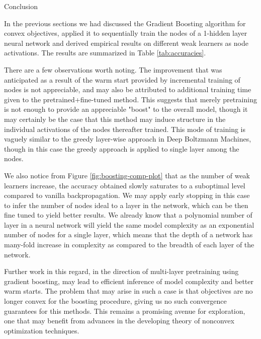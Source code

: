 \documentclass{article}
\begin{document}
\begin{psection}{Conclusion}

	In the previous sections we had discussed the Gradient Boosting algorithm for convex objectives, applied it to sequentially train the nodes of a 1-hidden layer neural network and derived empirical results on different weak learners as node activations. The results are summarized in Table \ref{tab:accuracies}.

	There are a few observations worth noting. The improvement that was anticipated as a result of the warm start provided by incremental training of nodes is not appreciable, and may also be attributed to additional training time given to the pretrained+fine-tuned method. This suggests that merely pretraining is not enough to provide an appreciable "boost" to the overall model, though it may certainly be the case that this method may induce structure in the individual activations of the nodes thereafter trained. This mode of training is vaguely similar to the greedy layer-wise approach in Deep Boltzmann Machines, though in this case the greedy approach is applied to single layer among the nodes.

	We also notice from Figure \ref{fig:boosting-comp-plot} that as the number of weak learners increase, the accuracy obtained slowly saturates to a suboptimal level compared to vanilla backpropagation. We may apply early stopping in this case to infer the number of nodes ideal to a layer in the network, which can be then fine tuned to yield better results. We already know that a polynomial number of layer in a neural network will yield the same model complexity as an exponential number of nodes for a single layer, which means that the depth of a network has many-fold increase in complexity as compared to the breadth of each layer of the network.

	Further work in this regard, in the direction of multi-layer pretraining using gradient boosting, may lead to efficient inference of model complexity and better warm starts. The problem that may arise in such a  case is that objectives are no longer convex for the boosting procedure, giving us no such convergence guarantees for this methods. This remains a promising avenue for exploration, one that may benefit from advances in the developing theory of nonconvex optimization techniques.

\end{psection}



\end{document}
